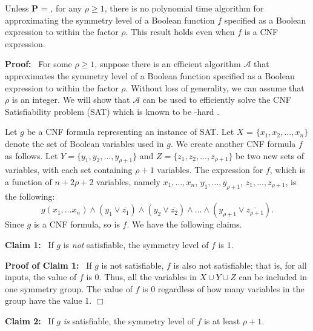 \newcommand{\cala}{\mbox{$\mathcal{A}$}}

\begin{theorem}\label{thm:approx_sym_level_hard}
Unless \textbf{P} = \cnp,
for any $\rho \geq 1$, there is no polynomial time 
algorithm for approximating the 
symmetry level of a Boolean function $f$ 
specified as a Boolean expression to within the factor $\rho$.
This result holds even when $f$ is a CNF expression.
\end{theorem}

\noindent
\textbf{Proof:}~ For some $\rho \geq 1$, suppose there is an efficient algorithm \cala{} 
that approximates the symmetry level of a Boolean function
specified as a Boolean expression to within the factor $\rho$.
Without loss of generality, we can assume that $\rho$ is an integer.
We will show that \cala{} can be used to efficiently solve
the CNF Satisfiability problem (SAT) which is known 
to be \cnp-hard \cite{GJ-1979}.

Let $g$ be a CNF formula representing an instance of SAT.
Let $X$ = $\{x_1, x_2, \ldots, x_n\}$ denote the set of
Boolean variables used in $g$.
We create another CNF formula $f$ as follows.
Let $Y = \{y_1, y_2, \ldots, y_{\rho+1}\}$ and
$Z = \{z_1, z_2, \ldots, z_{\rho+1}\}$ be two 
new sets of variables, with each set containing $\rho+1$ variables.
The expression for $f$, which is a function of $n+2\rho+2$
variables, namely $x_1, \ldots, x_n$, $y_1, \ldots, y_{\rho+1}$,
$z_1, \ldots, z_{\rho+1}$, is the following:
\[
    g(x_1, \ldots x_n) \wedge (y_1 \vee \overline{z_1}) 
                       \wedge (y_2 \vee \overline{z_2}) 
                       \wedge \ldots \wedge
                              (y_{\rho+1} \vee \overline{z_{\rho+1}}).
\]
Since $g$ is a CNF formula, so is $f$.
We have the following claims.

\medskip

\noindent
\textbf{Claim 1:}~ If $g$ is \emph{not} satisfiable, 
the symmetry level of $f$ is 1.

\smallskip

\noindent
\textbf{Proof of Claim 1:}~ If $g$ is not satisfiable, $f$ is also
not satisfiable; that is, for all inputs, the value of $f$ is 0.
Thus, all the variables in $X \cup Y \cup Z$ can be included in one
symmetry group.
The value of $f$ is 0 regardless of how many variables in the
group have the value 1.  \hfill$\Box$

\medskip

\noindent
\textbf{Claim 2:}~ If $g$ \emph{is} satisfiable, 
the symmetry level of $f$ is at least $\rho+1$.

